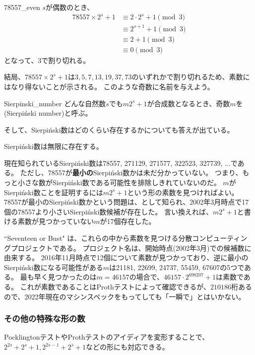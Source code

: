 \begin{prProof}{78557_even}
$s$が偶数のとき、
\begin{align*}
78557\times 2^s+1 &\equiv 2 \cdot 2^s + 1 \pmod{3}\\
&\equiv 2^{s+1} + 1 \pmod{3}\\
&\equiv 2 + 1 \pmod{3}\\
&\equiv 0 \pmod{3}
\end{align*}
となって、3で割り切れる。
\end{prProof}

結局、$78557\times 2^s+1$は$3, 5, 7, 13, 19, 37, 73$のいずれかで割り切れるため、素数にはなり得ないことが示される。
このような奇数に名前を与えよう。

\begin{Defi}{}{Sierpinski_number}
どんな自然数$s$でも$m2^s+1$が合成数となるとき、奇数$m$を(Sierpiński number)と呼ぶ。
\end{Defi}

そして、Sierpiński数はどのくらい存在するかについても答えが出ている。

\begin{Theo}{\cite{Sierpinski1960}}{}
Sierpiński数は無限に存在する。
\end{Theo}

現在知られているSierpiński数は78557, 271129, 271577, 322523, 327739, $\ldots$である。
ただし、78557が\textbf{最小の}Sierpiński数かは未だ分かっていない。
つまり、もっと小さな数がSierpiński数である可能性を排除しきれていないのだ。
$m$がSierpiński数ことを証明するには$m2^s+1$という形の素数を見つければよい。
78557が最小のSierpiński数かという問題は、として知られ、2002年3月時点で17個の78557より小さいSierpiński数候補が存在した。
言い換えれば、$m2^s+1$と書ける素数が見つかっていない$m$が17個存在した。

``Seventeen or Bust" は、これらの中から素数を見つける分散コンピューティングプロジェクトである。
プロジェクト名は、開始時点(2002年3月)での候補数に由来する。
2016年11月時点で12個について素数が見つかっており、逆に最小のSierpiński数になる可能性がある$m$は21181, 22699, 24737, 55459, 67607の5つである。
最も早く見つかったのは$m=46157$の場合で、$46157\cdot2^{698207}+1$は素数である。
これが素数であることはProthテストによって確認できるが、$210186$桁あるので、2022年現在のマシンスペックをもってしても「一瞬で」とはいかない。

\subsubsection{その他の特殊な形の数}
PocklingtonテストやProthテストのアイディアを変形することで、$2^{2s}+2^s+1, 2^{2s-1}+2^s+1$などの形にも対応できる。

